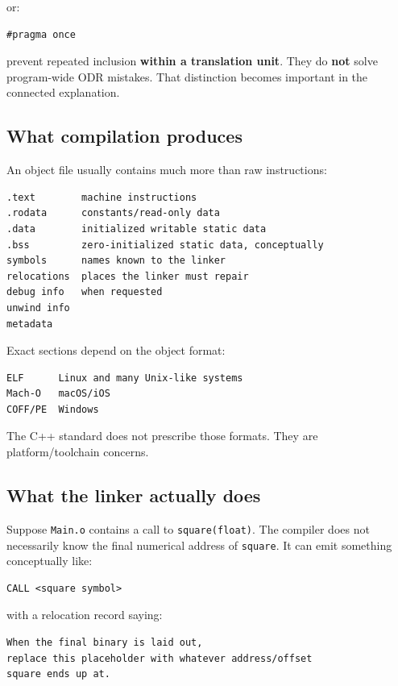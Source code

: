 or:

\begin{verbatim}
#pragma once
\end{verbatim}

prevent repeated inclusion \textbf{within a translation unit}. They do \textbf{not} solve program-wide ODR mistakes. That distinction becomes important in the connected explanation.

\subsection{What compilation produces}\label{01-foundations-i-ch002-what-compilation-produces}

An object file usually contains much more than raw instructions:

\begin{verbatim}
.text        machine instructions
.rodata      constants/read-only data
.data        initialized writable static data
.bss         zero-initialized static data, conceptually
symbols      names known to the linker
relocations  places the linker must repair
debug info   when requested
unwind info
metadata
\end{verbatim}

Exact sections depend on the object format:

\begin{verbatim}
ELF      Linux and many Unix-like systems
Mach-O   macOS/iOS
COFF/PE  Windows
\end{verbatim}

The C++ standard does not prescribe those formats. They are platform/toolchain concerns.

\subsection{What the linker actually does}\label{01-foundations-i-ch002-what-the-linker-actually-does}

Suppose \texttt{Main.o} contains a call to \texttt{square(float)}. The compiler does not necessarily know the final numerical address of \texttt{square}. It can emit something conceptually like:

\begin{verbatim}
CALL <square symbol>
\end{verbatim}

with a relocation record saying:

\begin{verbatim}
When the final binary is laid out,
replace this placeholder with whatever address/offset
square ends up at.
\end{verbatim}

